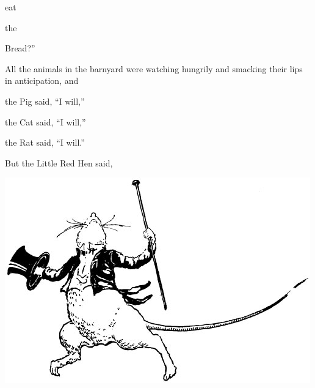 \documentclass[letterpaper, 10pt, openany]{memoir}
\begin{document}
\indent\hspace{0.5cm} eat

\vspace{\onelineskip}

\indent\hspace{0.75cm} the

\vspace{\onelineskip}

\indent\hspace{1cm} Bread?''

\newpage

All the animals in the barnyard were watching hungrily and smacking their lips in anticipation, and

\vspace{\onelineskip}

\indent\hspace{0.25cm} the Pig said, ``I will,''

\vspace{\onelineskip}

\indent\hspace{0.25cm} the Cat said, ``I will,''

\vspace{\onelineskip}

\indent\hspace{0.25cm} the Rat said, ``I will.''

\vspace{\onelineskip}

But the Little Red Hen said,

\begin{center}
	\includegraphics[width=\textwidth]{image_041.jpg}
\end{center}
\end{document}
